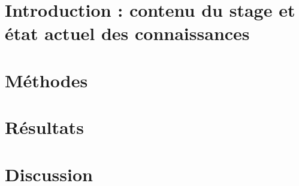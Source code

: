 \documentclass{beamer}
\begin{document}
\section{Introduction : contenu du stage et \'etat actuel des connaissances}
%

\section{M\'ethodes}
%

\section{R\'esultats}
%

\section{Discussion}
%

\end{document}
